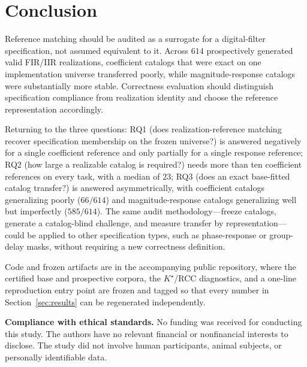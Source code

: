 \documentclass{article}
\begin{document}
\section{Conclusion}
\label{sec:conc}

Reference matching should be audited as a surrogate for a
digital-filter specification, not assumed equivalent to it.
Across $614$ prospectively generated valid FIR/IIR realizations,
coefficient catalogs that were exact on one implementation
universe transferred poorly, while magnitude-response catalogs
were substantially more stable.
Correctness evaluation should distinguish specification
compliance from realization identity and choose the reference
representation accordingly.

Returning to the three questions: RQ1 (does realization-reference
matching recover specification membership on the frozen universe?)
is answered negatively for a single coefficient reference and only
partially for a single response reference; RQ2 (how large a
realizable catalog is required?) needs more than ten coefficient
references on every task, with a median of $23$; RQ3 (does an
exact base-fitted catalog transfer?) is answered asymmetrically,
with coefficient catalogs generalizing poorly ($66/614$) and
magnitude-response catalogs generalizing well but imperfectly
($585/614$).
The same audit methodology---freeze catalogs, generate a
catalog-blind challenge, and measure transfer by representation---
could be applied to other specification types, such as
phase-response or group-delay masks, without requiring a new
correctness definition.

Code and frozen artifacts are in the accompanying public
repository, where the certified base and prospective corpora, the
$K^\star$/RCC diagnostics, and a one-line reproduction entry point
are frozen and tagged so that every number in
Section~\ref{sec:results} can be regenerated independently.

\clearpage
\noindent\textbf{Compliance with ethical standards.}
No funding was received for conducting this study.
The authors have no relevant financial or nonfinancial interests
to disclose.
The study did not involve human participants, animal subjects, or
personally identifiable data.



\end{document}
